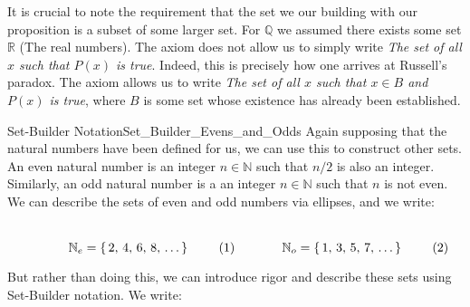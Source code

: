             It is crucial to note the requirement that the set we our building
            with our proposition is a subset of some larger set. For
            $\mathbb{Q}$ we assumed there exists some set $\mathbb{R}$ (The
            real numbers). The axiom does not allow us to simply write
            \textit{The set of all $x$ such that $P(x)$ is true}. Indeed, this is
            precisely how one arrives at Russell's paradox. The axiom
            allows us to write
            \textit{The set of all $x$ such that $x\in{B}$ and $P(x)$ is true},
            where $B$ is some set whose existence has already been established.
            \begin{lexample}{Set-Builder Notation}{Set_Builder_Evens_and_Odds}
                Again supposing that the natural numbers have been defined for us,
                we can use this to construct other sets. An even natural number
                is an integer $n\in\mathbb{N}$ such that $n/2$ is also an integer.
                Similarly, an odd natural number is a an integer $n\in\mathbb{N}$
                such that $n$ is not even. We can describe the sets of even and
                odd numbers via ellipses, and we write:
                \par
                \begin{subequations}
                    \begin{minipage}[b]{0.49\textwidth}
                        \centering
                        \begin{equation}
                            \mathbb{N}_{e}=\{\,2,\,4,\,6,\,8,\,\dots\,\}
                        \end{equation}
                    \end{minipage}
                    \hfill
                    \begin{minipage}[b]{0.49\textwidth}
                        \centering
                        \begin{equation}
                            \mathbb{N}_{o}=\{\,1,\,3,\,5,\,7,\,\dots\,\}
                        \end{equation}
                    \end{minipage}
                \end{subequations}
                \par\vspace{2.5ex}
                But rather than doing this, we can introduce rigor and describe
                these sets using Set-Builder notation. We write:
                \par

\end{lexample}
